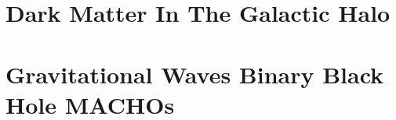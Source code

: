 
\section{Dark Matter In The Galactic Halo}

\section{Gravitational Waves Binary Black Hole MACHOs}

